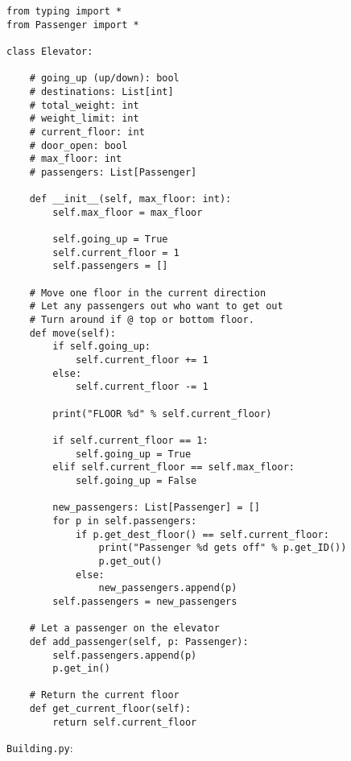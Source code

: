 \documentclass{article}
\begin{document}
\begin{verbatim}
from typing import *
from Passenger import *

class Elevator:

    # going_up (up/down): bool
    # destinations: List[int]
    # total_weight: int
    # weight_limit: int
    # current_floor: int
    # door_open: bool
    # max_floor: int
    # passengers: List[Passenger]

    def __init__(self, max_floor: int):
        self.max_floor = max_floor

        self.going_up = True
        self.current_floor = 1
        self.passengers = []

    # Move one floor in the current direction
    # Let any passengers out who want to get out
    # Turn around if @ top or bottom floor.
    def move(self):
        if self.going_up:
            self.current_floor += 1
        else:
            self.current_floor -= 1

        print("FLOOR %d" % self.current_floor)

        if self.current_floor == 1:
            self.going_up = True
        elif self.current_floor == self.max_floor:
            self.going_up = False

        new_passengers: List[Passenger] = []
        for p in self.passengers:
            if p.get_dest_floor() == self.current_floor:
                print("Passenger %d gets off" % p.get_ID())
                p.get_out()
            else:
                new_passengers.append(p)
        self.passengers = new_passengers

    # Let a passenger on the elevator
    def add_passenger(self, p: Passenger):
        self.passengers.append(p)
        p.get_in()

    # Return the current floor
    def get_current_floor(self):
        return self.current_floor
\end{verbatim}

\newpage
\noindent \texttt{Building.py}:
\end{document}

